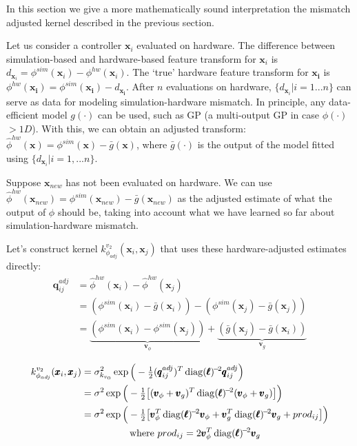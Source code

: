 In this section we give a more mathematically sound interpretation the mismatch adjusted kernel described in the previous section.

Let us consider a controller $\pmb{x}_i$ evaluated on hardware. The difference between simulation-based and hardware-based feature transform for $\pmb{x}_i$ is $d_{\pmb{x}_i} = \phi^{sim}(\pmb{x}_i) - \phi^{hw}(\pmb{x}_i)$. The `true' hardware feature transform for $\pmb{x_i}$ is $\phi^{hw}(\pmb{x_i}) = \phi^{sim}(\pmb{x_i}) - d_{\pmb{x_i}}$. After $n$ evaluations on hardware, $\{ d_{\pmb{x}_i} | i=1...n \}$ can serve as data for modeling simulation-hardware mismatch. In principle, any data-efficient model $g(\cdot)$ can be used, such as GP (a multi-output GP in case $\phi(\cdot)$ $>1D$). With this, we can obtain an adjusted transform: $\hat{\phi}^{hw}(\pmb{x}) = \phi^{sim}(\pmb{x}) - \bar{g}(\pmb{x})$, where $\bar{g}(\cdot)$ is the output of the model fitted using $\{d_{\pmb{x}_i} | i=1,...n \}$.

Suppose $\pmb{x}_{new}$ has not been evaluated on hardware. We can use $\hat{\phi}^{hw}(\pmb{x}_{new}) = \phi^{sim}(\pmb{x}_{new}) - \bar{g}(\pmb{x}_{new})$ as the adjusted estimate of what the output of $\phi$ should be, taking into account what we have learned so far about simulation-hardware mismatch.

Let's construct kernel $k^{v_2}_{\phi_{adj}}(\pmb{x}_i, \pmb{x}_j)$ that uses these hardware-adjusted estimates directly:
\begin{equation*}
\begin{split}
\pmb{q}_{ij}^{adj} &= \hat{\phi}^{hw}(\pmb{x}_{i}) - \hat{\phi}^{hw}(\pmb{x}_{j}) \\
&= (\phi^{sim}(\pmb{x}_{i}) - \bar{g}(\pmb{x}_i)) - (\phi^{sim}(\pmb{x}_{j}) - \bar{g}(\pmb{x}_j) ) \\
&= \underbrace{(\phi^{sim}(\pmb{x}_{i}) - \phi^{sim}(\pmb{x}_{j}))}_{\pmb{v}_{\phi}} + \underbrace{(\bar{g}(\pmb{x}_j) - \bar{g}(\pmb{x}_i) )}_{\pmb{v}_{g}}
\end{split}
\end{equation*}

\begin{align*}
k^{v_2}_{\phi_{adj}}(\pmb{x}_i, \pmb{x}_j) &= \sigma^2_{k_{v_0}} \exp\Big(- \tfrac{1}{2} (\pmb{q}_{ij}^{adj})^T \diag(\pmb{\ell})^{\!-\!2} \pmb{q}_{ij}^{adj} \Big) \\
& = \sigma^2 \exp\Big(- \tfrac{1}{2} \big[ (\pmb{v}_{\phi} + \pmb{v}_{g})^T \diag(\pmb{\ell})^{\!-\!2} (\pmb{v}_{\phi} + \pmb{v}_{g}) \big] \Big) \\
& = \sigma^2
\exp\Big(- \tfrac{1}{2} \big[ \pmb{v}_{\phi}^T \diag(\pmb{\ell})^{\!-\!2} \pmb{v}_{\phi} + \pmb{v}_{g}^T\diag(\pmb{\ell})^{\!-\!2} \pmb{v}_{g} + prod_{ij} \big] \Big)\\
&\quad \quad \quad \quad \quad \text{where } prod_{ij} = 2 \pmb{v}_{\phi}^T\diag(\pmb{\ell})^{\!-\!2} \pmb{v}_{g}
\end{align*}

